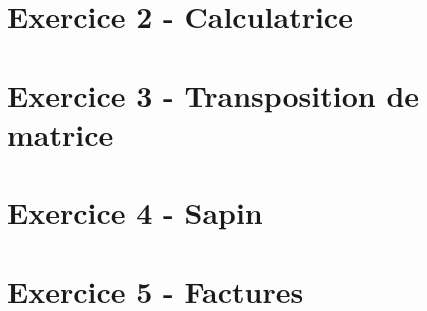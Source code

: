 \documentclass[12pt,a4paper]{article}
\begin{document}
\vspace*{0.7cm}



\newpage

\section{Exercice 2 - Calculatrice}

\vspace*{0.7cm}



\newpage

\section{Exercice 3 - Transposition de matrice}

\vspace*{0.7cm}



\newpage

\section{Exercice 4 - Sapin}

\vspace*{0.7cm}



\newpage

\section{Exercice 5 - Factures}

\vspace*{0.7cm}


\end{document}
